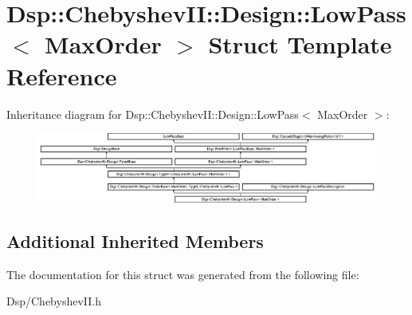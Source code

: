 \hypertarget{structDsp_1_1ChebyshevII_1_1Design_1_1LowPass}{\section{Dsp\-:\-:Chebyshev\-I\-I\-:\-:Design\-:\-:Low\-Pass$<$ Max\-Order $>$ Struct Template Reference}
\label{structDsp_1_1ChebyshevII_1_1Design_1_1LowPass}
}
Inheritance diagram for Dsp\-:\-:Chebyshev\-I\-I\-:\-:Design\-:\-:Low\-Pass$<$ Max\-Order $>$\-:\begin{figure}[H]
\begin{center}
\leavevmode
\includegraphics[height=2.295082cm]{structDsp_1_1ChebyshevII_1_1Design_1_1LowPass}
\end{center}
\end{figure}
\subsection*{Additional Inherited Members}


The documentation for this struct was generated from the following file\-:\begin{DoxyCompactItemize}
\item 
Dsp/Chebyshev\-I\-I.\-h\end{DoxyCompactItemize}
